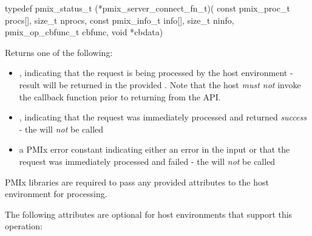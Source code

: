 \format

\cspecificstart
\begin{codepar}
typedef pmix_status_t (*pmix_server_connect_fn_t)(
                             const pmix_proc_t procs[],
                             size_t nprocs,
                             const pmix_info_t info[],
                             size_t ninfo,
                             pmix_op_cbfunc_t cbfunc,
                             void *cbdata)
\end{codepar}
\cspecificend

\begin{arglist}
\end{arglist}

Returns one of the following:

\begin{itemize}
    \item {}, indicating that the request is being processed by the host environment - result will be returned in the provided . Note that the host \emph{must not} invoke the callback function prior to returning from the \ac{API}.
    \item {}, indicating that the request was immediately processed and returned \textit{success} - the  will \textit{not} be called
    \item a PMIx error constant indicating either an error in the input or that the request was immediately processed and failed - the  will \textit{not} be called
\end{itemize}

\reqattrstart
\ac{PMIx} libraries are required to pass any provided attributes to the host environment for processing.
\reqattrend

\optattrstart
The following attributes are optional for host environments that support this operation:


